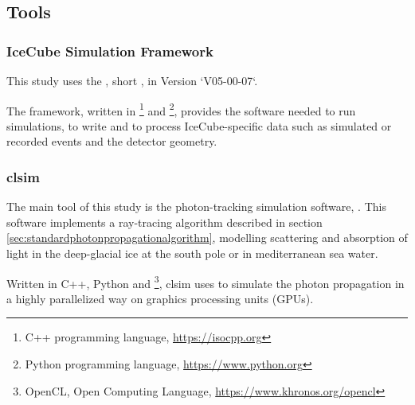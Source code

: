 
\subsection{Tools}

\subsubsection{IceCube Simulation Framework}

This study uses the , short , in Version `V05-00-07`.

The framework, written in \footnote{C++ programming language, \url{https://isocpp.org}} and \footnote{Python programming language, \url{https://www.python.org}}, provides the software needed to run simulations, to write and to process IceCube-specific data such as simulated or recorded events and the detector geometry.





\subsubsection{clsim}

The main tool of this study is the photon-tracking simulation software, . This software implements a ray-tracing algorithm described in section \ref{sec:standardphotonpropagationalgorithm}, modelling scattering and absorption of light in the deep-glacial ice at the south pole or in mediterranean sea water. \cite{clsimreadme}

Written in C++, Python and \footnote{OpenCL, Open Computing Language, \url{https://www.khronos.org/opencl}}, clsim uses  to simulate the photon propagation in a highly parallelized way on graphics processing units (GPUs).

